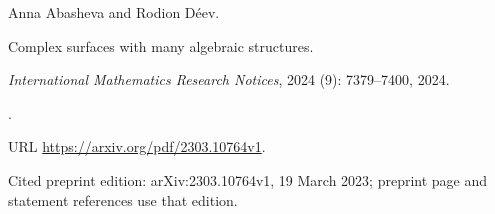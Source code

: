 Anna Abasheva and Rodion D{\'e}ev.

\newblock Complex surfaces with many algebraic structures.

\newblock \emph{International Mathematics Research Notices}, 2024
  (9): 7379--7400, 2024.

\newblock {}.

\newblock URL \url{https://arxiv.org/pdf/2303.10764v1}.

\newblock Cited preprint edition: arXiv:2303.10764v1, 19 March 2023; preprint page and statement references use that edition.

